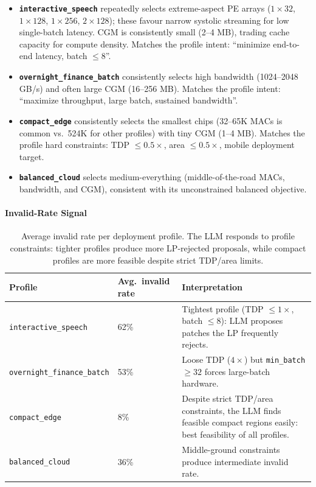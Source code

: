 \begin{itemize}[leftmargin=1.4em, itemsep=3pt]

    \item \textbf{\texttt{interactive\_speech}} repeatedly selects
          extreme-aspect PE arrays ($1{\times}32$, $1{\times}128$, $1{\times}256$, $2{\times}128$); these favour narrow systolic streaming for low single-batch latency.
CGM is consistently small (2–4 MB), trading cache capacity for compute density.
Matches the profile intent: ``minimize end-to-end latency, batch $\leq 8$''.

    \item \textbf{\texttt{overnight\_finance\_\allowbreak batch}} consistently
          selects high bandwidth (1024–2048 GB/s) and often large CGM (16–256 MB).
Matches the profile intent: ``maximize throughput, large batch, sustained bandwidth''.

    \item \textbf{\texttt{compact\_edge}} consistently selects the
          smallest chips (32–65K MACs is common vs.\ 524K for other profiles) with tiny CGM (1–4 MB).
Matches the profile hard constraints: TDP $\leq 0.5\times$, area $\leq 0.5\times$, mobile deployment target.

    \item \textbf{\texttt{balanced\_cloud}} selects medium-everything
          (middle-of-the-road MACs, bandwidth, and CGM), consistent with its unconstrained balanced objective.

\end{itemize}

\paragraph{Invalid-Rate Signal}

\begin{table}[h]
\centering
\caption{Average invalid rate per deployment profile. The LLM responds
to profile constraints: tighter profiles produce more LP-rejected
proposals, while compact profiles are more feasible despite strict
TDP/area limits.}
\label{tab:profile_invalid_rates}
\begin{tabularx}{\linewidth}{@{}p{.29\linewidth}lX@{}}
\toprule
\textbf{Profile} & \textbf{Avg.\ invalid rate} & \textbf{Interpretation} \\
\midrule
\texttt{interactive\_speech}       & 62\% &
Tightest profile (TDP $\leq 1\times$, batch $\leq 8$): LLM proposes
patches the LP frequently rejects.
\\
\texttt{overnight\_finance\_\allowbreak batch} & 53\% &
Loose TDP ($4\times$) but \texttt{min\_batch} $\geq 32$ forces
large-batch hardware.
\\
\texttt{compact\_edge}             &  8\% &
Despite strict TDP/area constraints, the LLM finds feasible compact
regions easily: best feasibility of all profiles.
\\
\texttt{balanced\_cloud}           & 36\% &
Middle-ground constraints produce intermediate invalid rate.
\\
\bottomrule
\end{tabularx}
\end{table}


